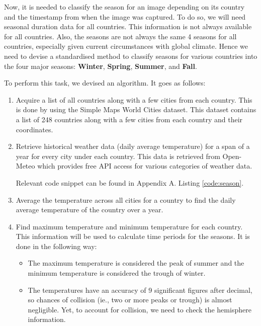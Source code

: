 Now, it is needed to classify the season for an image depending on its country and the timestamp from when the image was captured. To do so, we will need seasonal duration data for all countries. This information is not always available for all countries. Also, the seasons are not always the same 4 seasons for all countries, especially given current circumstances with global climate. Hence we need to devise a standardised method to classify seasons for various countries into the four major seasons: \textbf{Winter}, \textbf{Spring}, \textbf{Summer}, and \textbf{Fall}.

To perform this task, we devised an algorithm. It goes as follows:
\begin{enumerate}
    \item Acquire a list of all countries along with a few cities from each country. This is done by using the Simple Maps World Cities dataset\cite{world_cities}. This dataset contains a list of 248 countries along with a few cities from each country and their coordinates.
    \item Retrieve historical weather data (daily average temperature) for a span of a year for every city under each country. This data is retrieved from Open-Meteo\cite{Zippenfenig_Open-Meteo} which provides free API access for various categories of weather data.

    Relevant code snippet can be found in Appendix A. Listing \ref{code:season}.
    \item Average the temperature across all cities for a country to find the daily average temperature of the country over a year.
    \item Find maximum temperature and minimum temperature for each country. This information will be used to calculate time periods for the seasons. It is done in the following way:
    \begin{itemize}
        \item The maximum temperature is considered the peak of summer and the minimum temperature is considered the trough of winter.
        \item The temperatures have an accuracy of 9 significant figures after decimal, so chances of collision (ie., two or more peaks or trough) is almost negligible. Yet, to account for collision, we need to check the hemisphere information.


\end{itemize}
\end{enumerate}
